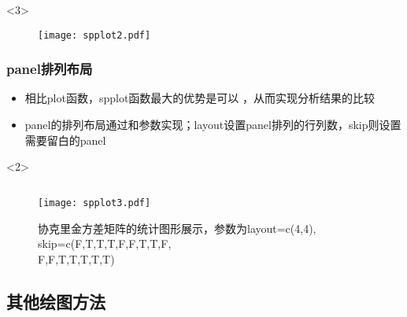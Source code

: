 \begin{frame}[t,fragile]{\subsecname}{\subsubsecname}
\begin{overlayarea}{\textwidth}{\textheight}
\begin{onlyenv}<3>
\begin{figure}[ht] \vspace{-20pt}
  \centering 
  \texttt{[image: spplot2.pdf]}
\end{figure}
\end{onlyenv}
\end{overlayarea}
\end{frame}

\subsubsection{panel排列布局}
\begin{frame}[t,fragile]{\subsecname}{\subsubsecname}
\begin{itemize} 
\item<1-> 相比plot函数，spplot函数最大的优势是可以
，从而实现分析结果的比较
\item<1-> panel的排列布局通过和参数实现；layout设置panel排列的行列数，skip则设置需要留白的panel
\end{itemize}

\begin{overlayarea}{\textwidth}{\textheight}
\begin{onlyenv}<2>
  \begin{figure} \vspace{-10pt}
    \begin{columns}
      \begin{column}{.6\textwidth}
        \texttt{[image: spplot3.pdf]}
      \end{column}
       \hspace{-40pt}    
      \begin{column}{.4\textwidth}
 \caption{协克里金方差矩阵的统计图形展示，参数为layout=c(4,4),\\skip=c(F,T,T,T,F,F,T,T,F,\\F,F,T,T,T,T,T)}
      \end{column}
    \end{columns}
  \end{figure}
\end{onlyenv}
\end{overlayarea}
\end{frame}

\subsection{其他绘图方法}